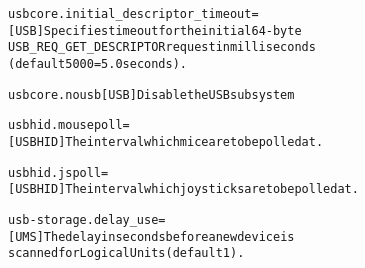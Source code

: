 \documentclass[a4paper,8pt,english]{sphinxmanual}
\begin{document}
\begin{alltt}
        usbcore.initial\_descriptor\_timeout=
                        {[}USB{]} Specifies timeout for the initial 64-byte
                        USB\_REQ\_GET\_DESCRIPTOR request in milliseconds
                        (default 5000 = 5.0 seconds).

        usbcore.nousb   {[}USB{]} Disable the USB subsystem

        usbhid.mousepoll=
                        {[}USBHID{]} The interval which mice are to be polled at.

        usbhid.jspoll=
                        {[}USBHID{]} The interval which joysticks are to be polled at.

        usb-storage.delay\_use=
                        {[}UMS{]} The delay in seconds before a new device is
                        scanned for Logical Units (default 1).


\end{alltt}
\end{document}
